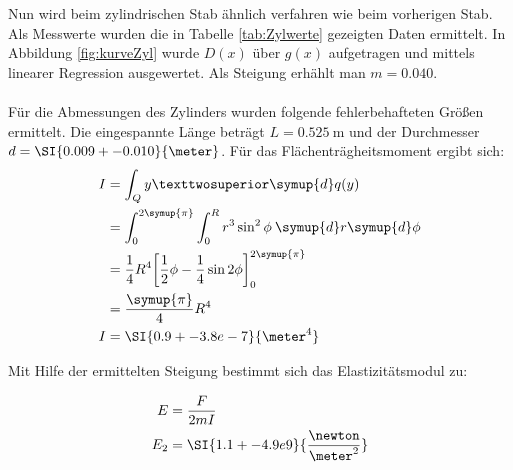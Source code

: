 Nun wird beim zylindrischen Stab ähnlich verfahren wie beim vorherigen Stab.
Als Messwerte wurden die in Tabelle \ref{tab:Zylwerte} gezeigten Daten ermittelt.
In Abbildung \ref{fig:kurveZyl} wurde $D(x)$ über $g(x)$ aufgetragen und mittels linearer Regression ausgewertet. Als Steigung erhählt man $m=\num{0.040}$.
\\
\\
Für die Abmessungen des Zylinders wurden folgende fehlerbehafteten Größen ermittelt.
Die eingespannte Länge beträgt $L=\SI{0.525}{\meter}$ und der Durchmesser $d=\SI{0.009+-0.010}{\meter}$.
Für das Flächenträgheitsmoment ergibt sich:
\begin{align*}
    I &= \int_Q y² \symup{d}q(y) \\
      &= \int_0^{2\symup{\pi}} \int_0^R r^3\sin^2\phi \: \symup{d}r\symup{d}\phi \\
      &= \frac{1}{4}R^4 \biggl[\frac{1}{2}\phi-\frac{1}{4}\sin2\phi\biggr]_0^{2\symup{\pi}} \\
      &= \frac{\symup{\pi}}{4}R^4 \\
    I &= \SI{0.9+-3.8e-7}{\meter^4} \\
\end{align*}

Mit Hilfe der ermittelten Steigung bestimmt sich das Elastizitätsmodul zu:

\begin{align*}
    E   &= \frac{F}{2mI} \\
    E_2 &= \SI{1.1+-4.9e9}{\frac{\newton}{\meter^2}} \\
\end{align*}

